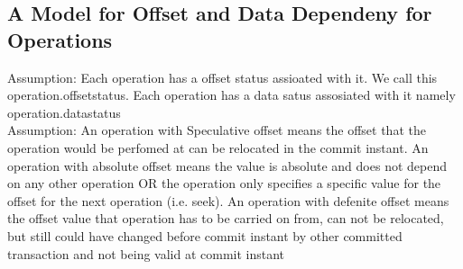 \documentclass[a4paper, 11pt]{article}
\begin{document}






\subsection{A Model for Offset and Data Dependeny for Operations}

Assumption: Each operation has a offset status assioated with it. We call this operation.offsetstatus. Each operation has a data satus assosiated with it namely operation.datastatus\\

Assumption:  An operation with Speculative offset means the offset that the operation would be perfomed at can be relocated in the commit instant. An operation with absolute offset means the value is absolute and does not depend on any other operation OR the operation only specifies a specific value for the offset for the next operation (i.e. seek). An operation with defenite offset means the offset value that operation has to be carried on from, can not be relocated, but still could have changed before commit instant by other committed transaction and not being valid at commit instant\\
\end{document}
